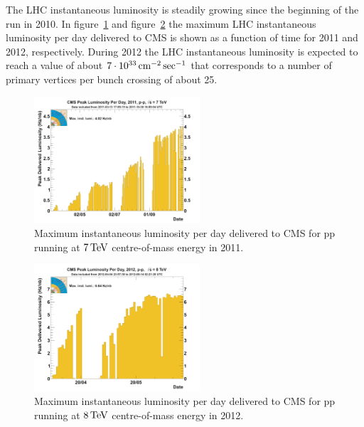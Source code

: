 The LHC instantaneous luminosity is steadily growing since the
beginning of the run in 2010. In figure~\ref{fig:LHCinstLumi2011} and
figure~\ref{fig:LHCinstLumi2012} the maximum LHC instantaneous
luminosity per day delivered to CMS is shown as a function of time for 2011 and 
2012, respectively. During 2012 the LHC instantaneous luminosity is expected to
reach a value of about $7\cdot10^{33}\rm \, cm^{-2}\sec^{-1}$ that corresponds to a number
of primary vertices per bunch crossing of about 25.
\begin{figure}[t]
\includegraphics*[width=0.55\textwidth]{figs/peak_lumi_per_day_pp_2011.png}\hspace{0.0002\textwidth}%
\begin{minipage}[b]{0.33\textwidth}\caption{\label{fig:LHCinstLumi2011}Maximum
    instantaneous luminosity per day delivered to CMS for pp running at $7{\rm \, TeV}$ centre-of-mass energy in 2011.} 
\end{minipage}
\end{figure}
\begin{figure}[b]
\includegraphics*[width=0.55\textwidth]{figs/peak_lumi_per_day_pp_2012.png}\hspace{0.0002\textwidth}%
\begin{minipage}[b]{0.33\textwidth}\caption{\label{fig:LHCinstLumi2012}Maximum
    instantaneous luminosity per day delivered to CMS for 
  pp running at $8{\rm \, TeV}$ centre-of-mass energy in 2012.} 
\end{minipage}
\end{figure}


